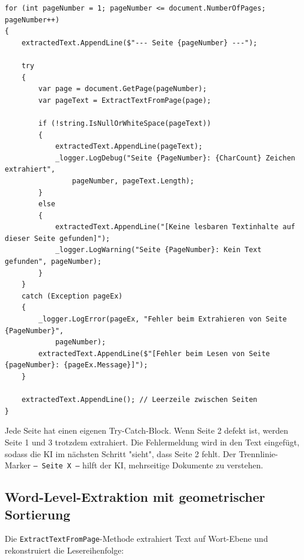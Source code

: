 \begin{lstlisting}[language={[Sharp]C}, caption={Robuste Seiten-Iteration}, label={lst:pdf_page_iteration}]
for (int pageNumber = 1; pageNumber <= document.NumberOfPages; pageNumber++)
{
    extractedText.AppendLine($"--- Seite {pageNumber} ---");
    
    try
    {
        var page = document.GetPage(pageNumber);
        var pageText = ExtractTextFromPage(page);
        
        if (!string.IsNullOrWhiteSpace(pageText))
        {
            extractedText.AppendLine(pageText);
            _logger.LogDebug("Seite {PageNumber}: {CharCount} Zeichen extrahiert", 
                pageNumber, pageText.Length);
        }
        else
        {
            extractedText.AppendLine("[Keine lesbaren Textinhalte auf dieser Seite gefunden]");
            _logger.LogWarning("Seite {PageNumber}: Kein Text gefunden", pageNumber);
        }
    }
    catch (Exception pageEx)
    {
        _logger.LogError(pageEx, "Fehler beim Extrahieren von Seite {PageNumber}", 
            pageNumber);
        extractedText.AppendLine($"[Fehler beim Lesen von Seite {pageNumber}: {pageEx.Message}]");
    }
    
    extractedText.AppendLine(); // Leerzeile zwischen Seiten
}
\end{lstlisting}

Jede Seite hat einen eigenen Try-Catch-Block. Wenn Seite 2 defekt ist, werden Seite 1 und 3 trotzdem extrahiert. Die Fehlermeldung wird in den Text eingefügt, sodass die KI im nächsten Schritt "sieht", dass Seite 2 fehlt. Der Trennlinie-Marker \texttt{--- Seite X ---} hilft der KI, mehrseitige Dokumente zu verstehen.

\subsection{Word-Level-Extraktion mit geometrischer Sortierung}
Die \texttt{ExtractTextFromPage}-Methode extrahiert Text auf Wort-Ebene und rekonstruiert die Lesereihenfolge:

